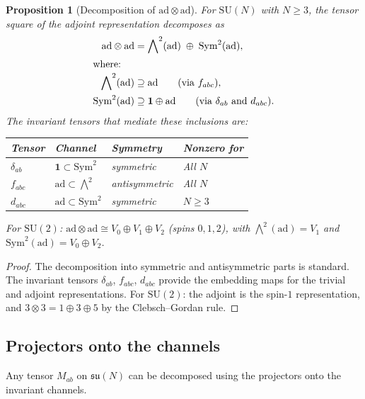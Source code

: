 \documentclass[11pt,a4paper]{article}
\theoremstyle{plain}
\newtheorem{proposition}[theorem]{Proposition}
\theoremstyle{definition}
\theoremstyle{remark}
\newcommand{\SU}{\mathrm{SU}}
\newcommand{\su}{\mathfrak{su}}
\newcommand{\ad}{\mathrm{ad}}
\newcommand{\Sym}{\mathrm{Sym}}
\begin{document}
\begin{proposition}[Decomposition of $\ad \otimes \ad$]\label{prop:ad-tensor}
For $\SU(N)$ with $N \geq 3$, the tensor square of the adjoint
representation decomposes as
\begin{align}
\ad \otimes \ad &= \bigwedge\nolimits^2(\ad) \;\oplus\; \Sym^2(\ad), \\
\intertext{where:}
\bigwedge\nolimits^2(\ad) &\supseteq \ad
\qquad\text{(via $f_{abc}$)}, \\
\Sym^2(\ad) &\supseteq \mathbf{1} \oplus \ad
\qquad\text{(via $\delta_{ab}$ and $d_{abc}$)}.
\end{align}
The invariant tensors that mediate these inclusions are:
\begin{center}
\begin{tabular}{llll}
\toprule
Tensor & Channel & Symmetry & Nonzero for \\
\midrule
$\delta_{ab}$ & $\mathbf{1} \subset \Sym^2$ & symmetric &
  All $N$ \\
$f_{abc}$ & $\ad \subset \bigwedge^2$ & antisymmetric & All $N$ \\
$d_{abc}$ & $\ad \subset \Sym^2$ & symmetric & $N \geq 3$ \\
\bottomrule
\end{tabular}
\end{center}
For $\SU(2)$: $\ad \otimes \ad \cong V_0 \oplus V_1 \oplus V_2$
(spins $0, 1, 2$), with $\bigwedge^2(\ad) = V_1$ and
$\Sym^2(\ad) = V_0 \oplus V_2$.
\end{proposition}

\begin{proof}
The decomposition into symmetric and antisymmetric parts is
standard. The invariant tensors $\delta_{ab}$, $f_{abc}$,
$d_{abc}$ provide the embedding maps for the trivial and adjoint
representations. For $\SU(2)$: the adjoint is the spin-$1$
representation, and $3 \otimes 3 = 1 \oplus 3 \oplus 5$ by the
Clebsch--Gordan rule.
\end{proof}


\subsection{Projectors onto the channels}

Any tensor $M_{ab}$ on $\su(N)$ can be decomposed using the
projectors onto the invariant channels.
\end{document}
